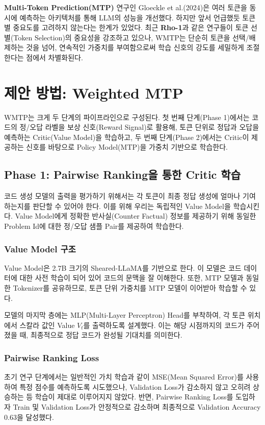 \documentclass[11pt,a4paper]{article}
\begin{document}
\textbf{Multi-Token Prediction(MTP)} 연구인 Gloeckle et al.(2024)은 여러 토큰을 동시에 예측하는 아키텍처를 통해 LLM의 성능을 개선했다. 하지만 앞서 언급했듯 토큰별 중요도를 고려하지 않는다는 한계가 있었다. 최근 \textbf{Rho-1}과 같은 연구들이 토큰 선별(Token Selection)의 중요성을 강조하고 있으나, WMTP는 단순히 토큰을 선택/배제하는 것을 넘어, 연속적인 가중치를 부여함으로써 학습 신호의 강도를 세밀하게 조절한다는 점에서 차별화된다.

\section{제안 방법: Weighted MTP}

WMTP는 크게 두 단계의 파이프라인으로 구성된다. 첫 번째 단계(Phase 1)에서는 코드의 정/오답 라벨을 보상 신호(Reward Signal)로 활용해, 토큰 단위로 정답과 오답을 예측하는 Critic(Value Model)을 학습하고, 두 번째 단계(Phase 2)에서는 Critic이 제공하는 신호를 바탕으로 Policy Model(MTP)을 가중치 기반으로 학습한다.

\subsection{Phase 1: Pairwise Ranking을 통한 Critic 학습}

코드 생성 모델의 출력을 평가하기 위해서는 각 토큰이 최종 정답 생성에 얼마나 기여하는지를 판단할 수 있어야 한다. 이를 위해 우리는 독립적인 Value Model을 학습시킨다. Value Model에게 정확한 반사실(Counter Factual) 정보를 제공하기 위해 동일한 Problem Id에 대한 정/오답 샘플 Pair를 제공하여 학습한다.

\subsubsection{Value Model 구조}
Value Model은 2.7B 크기의 Sheared-LLaMA를 기반으로 한다. 이 모델은 코드 데이터에 대한 사전 학습이 되어 있어 코드의 문맥을 잘 이해한다. 또한, MTP 모델과 동일한 Tokenizer를 공유하므로, 토큰 단위 가중치를 MTP 모델이 이어받아 학습할 수 있다. 

모델의 마지막 층에는 MLP(Multi-Layer Perceptron) Head를 부착하여, 각 토큰 위치에서 스칼라 값인 Value $V_t$를 출력하도록 설계했다. 이는 해당 시점까지의 코드가 주어졌을 때, 최종적으로 정답 코드가 완성될 기대치를 의미한다.

\subsubsection{Pairwise Ranking Loss}
초기 연구 단계에서는 일반적인 가치 학습과 같이 MSE(Mean Squared Error)를 사용하여 특정 점수를 예측하도록 시도했으나, Validation Loss가 감소하지 않고 오히려 상승하는 등 학습이 제대로 이루어지지 않았다. 반면, Pairwise Ranking Loss를 도입하자 Train 및 Validation Loss가 안정적으로 감소하며 최종적으로 Validation Accuracy 0.63을 달성했다.
\end{document}
